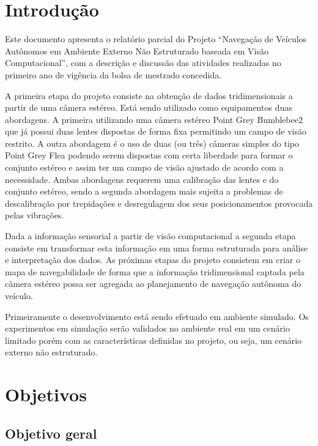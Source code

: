 \documentclass{article}
\begin{document}
\section{Introdução}

Este documento apresenta o relatório parcial do Projeto “Navegação de Veículos
Autônomos em Ambiente Externo Não Estruturado baseada em Visão Computacional”,
com a descrição e discussão das atividades realizadas no primeiro ano de
vigência da bolsa de mestrado concedida.

A primeira etapa do projeto consiste na obtenção de dados tridimensionais a
partir de uma câmera estéreo. Está sendo utilizado como equipamentos duas
abordagens. A primeira utilizando uma câmera estéreo Point Grey Bumblebee2 que
já possui duas lentes dispostas de forma fixa permitindo um campo de visão
restrito. A outra abordagem é o uso de duas (ou três) câmeras simples do tipo
Point Grey Flea podendo serem dispostas com certa liberdade para formar o
conjunto estéreo e assim ter um campo de visão ajustado de acordo com a
necessidade. Ambas abordagens requerem uma calibração das lentes e do conjunto
estéreo, sendo a segunda abordagem mais sujeita a problemas de descalibração por
trepidações e desregulagem dos seus posicionamentos provocada pelas vibrações.

Dada a informação sensorial a partir de visão computacional a segunda etapa
consiste em transformar esta informação em uma forma estruturada para análise e
interpretação dos dados. As próximas etapas do projeto consistem em criar o mapa
de navegabilidade de forma que a informação tridimensional captada pela câmera
estéreo possa ser agregada ao planejamento de navegação autônoma do veículo.

Primeiramente o desenvolvimento está sendo efetuado em ambiente simulado. Os
experimentos em simulação serão validados no ambiente real em um cenário
limitado porém com as características definidas no projeto, ou seja, um cenário
externo não estruturado.


\section{Objetivos}


\subsection{Objetivo geral}
\end{document}
